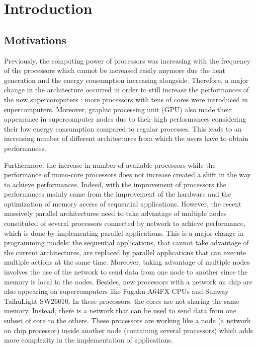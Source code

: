 \chapter{Introduction}

\section{Motivations}
Previously, the computing power of processors was increasing with the frequency of the processors which cannot be increased easily anymore due the heat generation and the energy consumption increasing alongside.
Therefore, a major change in the architecture occurred in order to still increase the performances of the new supercomputers : more processors with tens of cores were introduced in supercomputers.
Moreover, graphic processing unit (GPU) also made their appearance in supercomputer nodes due to their high performances considering their low energy consumption compared to regular processes.
This leads to an increasing number of different architectures from which the users have to obtain performances.

Furthermore, the increase in number of available processors while the performance of mono-core processors does not increase created a shift in the way to achieve performances.
Indeed, with the improvement of processors the performances mainly came from the improvement of the hardware and the optimization of memory access of sequential applications.
However, the recent massively parallel architectures need to take advantage of multiple nodes constituted of several processors connected by network to achieve performance, which is done by implementing parallel applications.
This is a major change in programming models: the sequential applications, that cannot take advantage of the current architectures, are replaced by parallel applications that can execute multiple actions at the same time.
Moreover, taking advantage of multiple nodes involves the use of the network to send data from one node to another since the memory is local to the nodes.
Besides, new processors with a network on chip are also appearing on supercomputers like Fugaku A64FX CPUs and Sunway TaihuLight SW26010.
In these processors, the cores are not sharing the same memory.
Instead, there is a network that can be used to send data from one subset of core to the others.
These processors are working like a node (a network on chip processor) inside another node (containing several processors) which adds more complexity in the implementation of applications.

